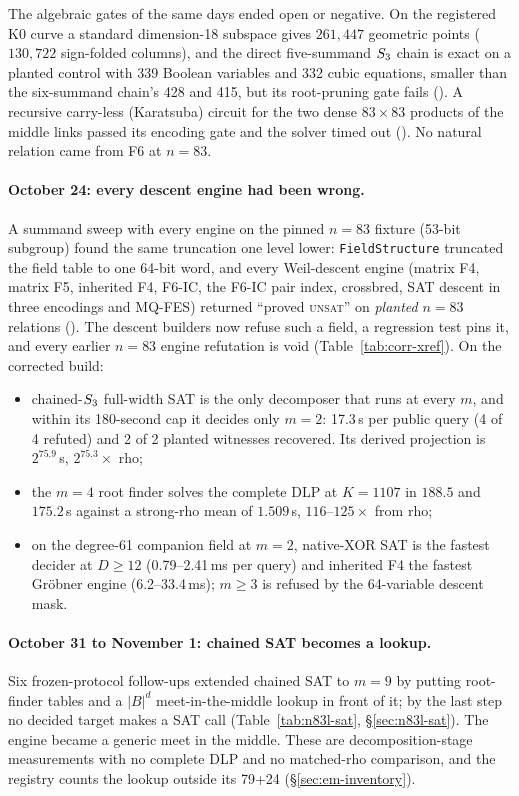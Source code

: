 The algebraic gates of the same days ended open or negative. On the
registered K0 curve a standard dimension-18 subspace gives $261{,}447$
geometric points ($130{,}722$ sign-folded columns), and the direct
five-summand $S_{3}$ chain is exact on a planted control with 339 Boolean
variables and 332 cubic equations, smaller than the six-summand chain's 428
and 415, but its root-pruning gate fails
(). A recursive
carry-less (Karatsuba) circuit for the two dense $83\times83$ products of the
middle links passed its encoding gate and the solver timed out
(). No natural relation
came from F6 at $n=83$.

\paragraph{October 24: every descent engine had been wrong.} A summand sweep
with every engine on the pinned $n=83$ fixture (53-bit subgroup) found the
same truncation one level lower: \texttt{FieldStructure} truncated the field
table to one 64-bit word, and every Weil-descent engine (matrix F4, matrix
F5, inherited F4, F6-IC, the F6-IC pair index, crossbred, SAT descent in
three encodings and MQ-FES) returned ``proved \textsc{unsat}'' on
\emph{planted} $n=83$ relations ().
The descent builders now refuse such a field, a regression test pins it, and
every earlier $n=83$ engine refutation is void
(Table~\ref{tab:corr-xref}). On the corrected build:
\begin{itemize}
\item chained-$S_{3}$ full-width SAT is the only decomposer that runs at
  every $m$, and within its 180-second cap it decides only $m=2$: 17.3\,s per
  public query (4 of 4 refuted) and 2 of 2 planted witnesses recovered. Its
  derived projection is $2^{75.9}$\,s, $2^{75.3}\times$ rho;
\item the $m=4$ root finder solves the complete DLP at $K=1107$ in
  $188.5$ and $175.2$\,s against a strong-rho mean of $1.509$\,s,
  $116$--$125\times$ from rho;
\item on the degree-61 companion field at $m=2$, native-XOR SAT is the
  fastest decider at $D\ge12$ (0.79--2.41\,ms per query) and inherited F4
  the fastest Gr\"obner engine (6.2--33.4\,ms); $m\ge3$ is refused by the
  64-variable descent mask.
\end{itemize}

\paragraph{October 31 to November 1: chained SAT becomes a lookup.} Six
frozen-protocol follow-ups extended chained SAT to $m=9$ by putting
root-finder tables and a $|B|^d$ meet-in-the-middle lookup in front of it;
by the last step no decided target makes a SAT call
(Table~\ref{tab:n83l-sat}, \S\ref{sec:n83l-sat}). The engine became a
generic meet in the middle. These are decomposition-stage measurements with
no complete DLP and no matched-rho comparison, and the registry counts the
lookup outside its 79+24 (\S\ref{sec:em-inventory}).

